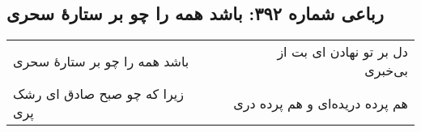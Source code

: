 \begin{center}
\section*{رباعی شماره ۳۹۲: باشد همه را چو بر ستارهٔ سحری}
\label{sec:sh392}
\begin{longtable}{l p{0.5cm} r}
باشد همه را چو بر ستارهٔ سحری
&&
دل بر تو نهادن ای بت از بی‌خبری
\\
زیرا که چو صبح صادق ای رشک پری
&&
هم پرده دریده‌ای و هم پرده دری
\\
\end{longtable}
\end{center}
